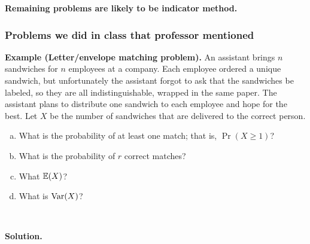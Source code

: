 \textbf{Remaining problems are likely to be indicator method.}



\subsubsection{Problems we did in class that professor mentioned}

\textbf{Example (Letter/envelope matching problem).} An assistant brings \(n\) sandwiches for \(n\) employees at a company. Each employee ordered a unique sandwich, but unfortunately the assistant forgot to ask that the sandwiches be labeled, so they are all indistinguishable, wrapped in the same paper. The assistant plans to distribute one sandwich to each employee and hope for the best. Let \(X\) be the number of sandwiches that are delivered to the correct person.

\begin{enumerate}[(a)]

\item What is the probability of at least one match; that is, \(\Pr(X \geq 1)\)?

\item What is the probability of \(r\) correct matches?

\item What \(\E(X)\)?

\item What is \(\Var(X)\)?

\end{enumerate}

\

\textbf{Solution.} 

